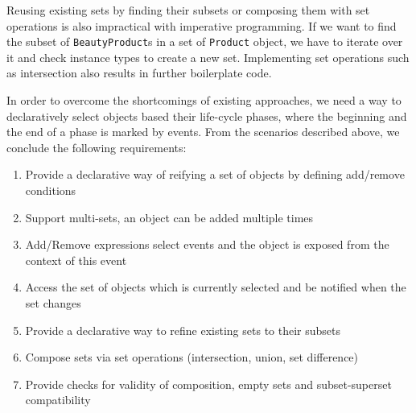 \documentclass{llncs}
\begin{document}
Reusing existing sets by finding their subsets or composing them with set operations is also impractical with imperative programming. If we want to find the subset of \texttt{BeautyProduct}s in a set of \texttt{Product} object, we have to iterate over it and check instance types to create a new set. Implementing set operations such as intersection also results in further boilerplate code.





In order to overcome the shortcomings of existing approaches, we need a way to declaratively select objects based their life-cycle phases, where the beginning and the end of a phase is marked by events. From the scenarios described above, we conclude the following requirements:

\begin{enumerate}[{Requirement}1{:}]
\item Provide a declarative way of reifying a set of objects by defining add/remove conditions
\item Support multi-sets, an object can be added multiple times
\item Add/Remove expressions select events and the object is exposed from the context of this event
\item Access the set of objects which is currently selected and be notified when the set changes
\item Provide a declarative way to refine existing sets to their subsets
\item Compose sets via set operations (intersection, union, set difference)
\item Provide checks for validity of composition, empty sets and subset-superset compatibility
\end{enumerate}
\end{document}
